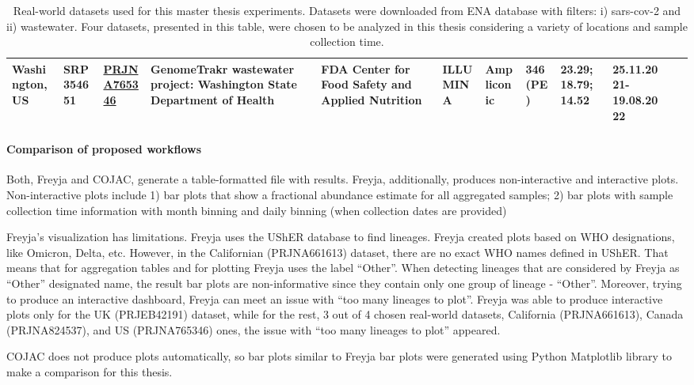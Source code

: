 \begin{landscape}
\begin{table}[ht!]
\begin{tabular}{l|l|l|l|l|l|l|l|l|l|l|l}
                    \multicolumn{1}{m{1.5cm}|}{Washington, US}&SRP354651&\href{https://www.ebi.ac.uk/ena/browser/view/PRJNA765346}{PRJNA765346}&\multicolumn{1}{m{2cm}|}{GenomeTrakr wastewater project: Washington State Department of Health}&\multicolumn{1}{m{2cm}|}{FDA Center for Food Safety and Applied Nutrition}&ILLUMINA&\multicolumn{1}{m{2cm}|}{Ampliconic}&346 (PE)&\multicolumn{1}{m{2cm}|}{23.29; 18.79; 14.52}&\multicolumn{1}{m{2cm}}{25.11.2021-19.08.2022} \\
                    \hline
                \end{tabular}
                \caption{Real-world datasets used for this master thesis experiments. Datasets were downloaded from ENA database \cite{ena} with filters: i) sars-cov-2 and ii) wastewater. Four datasets, presented in this table, were chosen to be analyzed in this thesis considering a variety of locations and sample collection time.} \label{tab:methods:real-datasets}
                \end{table}
                \vfill
            \end{landscape}
            
            \paragraph{Comparison of proposed workflows}
            Both, Freyja and COJAC, generate a table-formatted file with results. Freyja, additionally, produces non-interactive and interactive plots. Non-interactive plots include 1) bar plots that show a fractional abundance estimate for all aggregated samples; 2) bar plots with sample collection time information with month binning and daily binning (when collection dates are provided)

            Freyja’s visualization has limitations. Freyja uses the UShER database to find lineages. Freyja created plots based on WHO designations, like Omicron, Delta, etc. However, in the Californian (PRJNA661613) dataset, there are no exact WHO names defined in UShER. That means that for aggregation tables and for plotting Freyja uses the label “Other”. When detecting lineages that are considered by Freyja as “Other” designated name, the result bar plots are non-informative since they contain only one group of lineage - “Other”. Moreover, trying to produce an interactive dashboard, Freyja can meet an issue with “too many lineages to plot”. Freyja was able to produce interactive plots only for the UK (PRJEB42191) dataset, while for the rest, 3 out of 4 chosen real-world datasets, California (PRJNA661613), Canada (PRJNA824537), and US (PRJNA765346) ones, the issue with “too many lineages to plot” appeared.
            
            COJAC does not produce plots automatically, so bar plots similar to Freyja bar plots were generated using Python Matplotlib library to make a comparison for this thesis.
